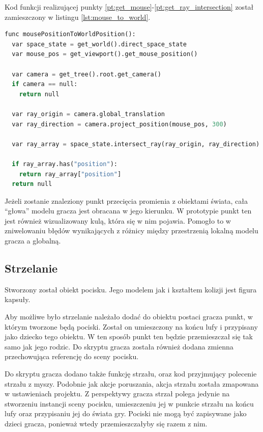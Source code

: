 Kod funkcji realizującej punkty \ref{pt:get_mouse}-\ref{pt:get_ray_intersection} został zamieszczony w listingu \ref{lst:mouse_to_world}.

\begin{lstlisting}[language=python,caption=Funkcja rzutująca mysz na świat gry, label=lst:mouse_to_world,basicstyle=\footnotesize\ttfamily]
func mousePositionToWorldPosition():
  var space_state = get_world().direct_space_state
  var mouse_pos = get_viewport().get_mouse_position()

  var camera = get_tree().root.get_camera()
  if camera == null:
    return null

  var ray_origin = camera.global_translation
  var ray_direction = camera.project_position(mouse_pos, 300)

  var ray_array = space_state.intersect_ray(ray_origin, ray_direction)

  if ray_array.has("position"):
    return ray_array["position"]
  return null
\end{lstlisting}

Jeżeli zostanie znaleziony punkt przecięcia promienia z obiektami świata, cała ``głowa'' modelu gracza jest obracana w jego kierunku. W prototypie punkt ten jest również wizualizowany kulą, która się w nim pojawia. Pomogło to w zniwelowaniu błędów wynikających z różnicy między przestrzenią lokalną modelu gracza a globalną. 

\subsection{Strzelanie}
Stworzony został obiekt pocisku. Jego modelem jak i kształtem kolizji jest figura kapsuły. 

Aby możliwe było strzelanie należało dodać do obiektu postaci gracza punkt, w którym tworzone będą pociski. Został on umieszczony na końcu lufy i przypisany jako dziecko tego obiektu. W ten sposób punkt ten będzie przemieszczał się tak samo jak jego rodzic. Do skryptu gracza została również dodana zmienna przechowująca referencję do sceny pocisku.

Do skryptu gracza dodano także funkcję strzału, oraz kod przyjmujący polecenie strzału z myszy. Podobnie jak akcje poruszania, akcja strzału została zmapowana w ustawieniach projektu. Z perspektywy gracza strzał polega jedynie na stworzeniu instancji sceny pocisku, umieszczeniu jej w punkcie strzału na końcu lufy oraz przypisaniu jej do świata gry. Pociski nie mogą być zapisywane jako dzieci gracza, ponieważ wtedy przemieszczałyby się razem z nim.

